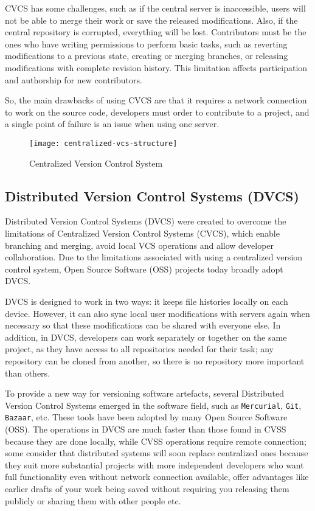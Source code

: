 CVCS has some challenges, such as if the central server is inaccessible, users will not be able to merge their work or save the released modifications. Also, if the central repository is corrupted, everything will be lost. Contributors must be the ones who have writing permissions to perform basic tasks, such as reverting modifications to a previous state, creating or merging branches, or releasing modifications with complete revision history. This limitation affects participation and authorship for new contributors.

So, the main drawbacks of using CVCS are that it requires a network connection to work on the source code, developers must order to contribute to a project, and a single point of failure is an issue when using one server.

\begin{figure}[htbp]
    \centering
    \texttt{[image: centralized-vcs-structure]}
    \caption{Centralized Version Control System}
    \label{fig:cvcs-structure}
\end{figure}

\subsection{Distributed Version Control Systems (DVCS)}
Distributed Version Control Systems (DVCS) were created to overcome the limitations of Centralized Version Control Systems (CVCS), which enable branching and merging, avoid local VCS operations and allow developer collaboration. Due to the limitations associated with using a centralized version control system, Open Source Software (OSS) projects today broadly adopt DVCS.

DVCS is designed to work in two ways: it keeps file histories locally on each device. However, it can also sync local user modifications with servers again when necessary so that these modifications can be shared with everyone else. In addition, in DVCS, developers can work separately or together on the same project, as they have access to all repositories needed for their task; any repository can be cloned from another, so there is no repository more important than others.

To provide a new way for versioning software artefacts, several Distributed Version Control Systems emerged in the software field, such as \lstinline{Mercurial}, \lstinline{Git}, \lstinline{Bazaar}, etc. These tools have been adopted by many Open Source Software (OSS). The operations in DVCS are much faster than those found in CVSS because they are done locally, while CVSS operations require remote connection; some consider that distributed systems will soon replace centralized ones because they suit more substantial projects with more independent developers who want full functionality even without network connection available, offer advantages like earlier drafts of your work being saved without requiring you releasing them publicly or sharing them with other people etc.

